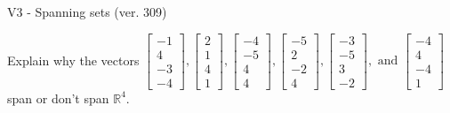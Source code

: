 \begin{exercise}
  \begin{exerciseTitle}V3 - Spanning sets (ver. 309)\end{exerciseTitle}
  \begin{exerciseStatement}
    Explain why the vectors \(\left[\begin{array}{r}
-1 \\
4 \\
-3 \\
-4
\end{array}\right] , \left[\begin{array}{r}
2 \\
1 \\
4 \\
1
\end{array}\right] , \left[\begin{array}{r}
-4 \\
-5 \\
4 \\
4
\end{array}\right] , \left[\begin{array}{r}
-5 \\
2 \\
-2 \\
4
\end{array}\right] , \left[\begin{array}{r}
-3 \\
-5 \\
3 \\
-2
\end{array}\right] , \text{ and } \left[\begin{array}{r}
-4 \\
4 \\
-4 \\
1
\end{array}\right]\) span or don't span \(\mathbb{R}^4\). 
	



\end{exerciseStatement}
\end{exercise}
